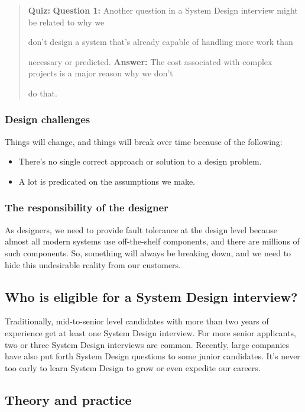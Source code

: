 \begin{quote}
\textbf{Quiz:}
\textbf{Question 1:} Another question in a System Design interview might be related to why we

don't design a system that's already capable of handling more work than

necessary or predicted.
\textbf{Answer:} The cost associated with complex projects is a major reason why we don't

do that.
\end{quote}

\subsubsection{Design challenges}\label{nZJnKsWiZ6bj_cIjKDdFU} Things will change, and things will break over time because of the following: \begin{itemize} \item {}\label{fiLYEOCeBPR1YLaGeiO7S} There's no single correct approach or solution to a design problem. \item {}\label{IXq9Ed_IvPwtFnOuQuv7H} A lot is predicated on the assumptions we make. \end{itemize} \subsubsection{The responsibility of the designer}\label{MTHYQVvlf7r6TLxOJsFHt} As designers, we need to provide fault tolerance at the design level because almost all modern systems use off-the-shelf components, and there are millions of such components. So, something will always be breaking down, and we need to hide this undesirable reality from our customers. \subsection{Who is eligible for a System Design interview?}\label{x5Sz5Sjx3GbmLnHTHXnIZ} Traditionally, mid-to-senior level candidates with more than two years of experience get at least one System Design interview. For more senior applicants, two or three System Design interviews are common. Recently, large companies have also put forth System Design questions to some junior candidates. It's never too early to learn System Design to grow or even expedite our careers. \subsection{Theory and practice}\label{Theory-and-practice}

